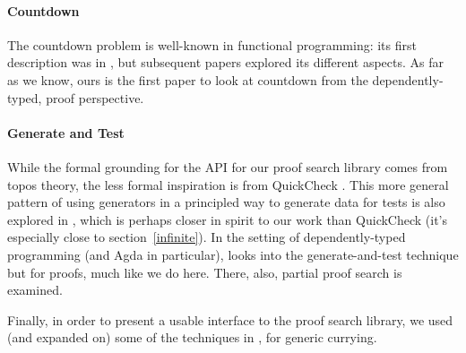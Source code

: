 \paragraph{Countdown}
The countdown problem is well-known in functional programming: its first
description was in \citet{huttonCountdownProblem2002}, but subsequent papers
\citep{birdCountdownCaseStudy2005, birdFunctionalPearlTrouble2003}
explored its different aspects.
As far as we know, ours is the first paper to look at countdown from the
dependently-typed, proof perspective.
\paragraph{Generate and Test}
While the formal grounding for the API for our proof search library comes from
topos theory, the less formal inspiration is from QuickCheck
\citep{claessenQuickCheckLightweightTool2011}.
This more general pattern of using generators in a principled way to generate
data for tests is also explored in \citet{runcimanSmallCheckLazySmallCheck2008},
which is perhaps closer in spirit to our work than QuickCheck (it's especially
close to section~\ref{infinite}).
In the setting of dependently-typed programming (and Agda in particular),
\citet{oconnorApplicationsApplicativeProof2016} looks into the generate-and-test
technique but for proofs, much like we do here.
There, also, partial proof search is examined.

Finally, in order to present a usable interface to the proof search library, we
used (and expanded on) some of the techniques in
\citet{allaisGenericLevelPolymorphic2019}, for generic currying.

